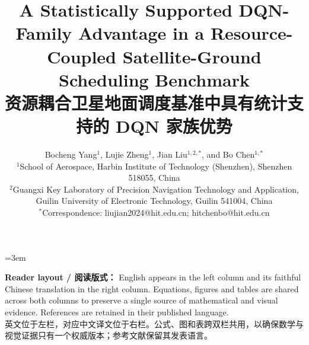 \documentclass[10pt]{article}
\title{\textbf{A Statistically Supported DQN-Family Advantage in a Resource-Coupled Satellite-Ground Scheduling Benchmark}\\[4pt]
\Large 资源耦合卫星地面调度基准中具有统计支持的 DQN 家族优势}
\author{
Bocheng Yang$^{1}$, Lujie Zheng$^{1}$, Jian Liu$^{1,2,*}$, and Bo Chen$^{1,*}$\\[3pt]
\small $^{1}$School of Aerospace, Harbin Institute of Technology (Shenzhen), Shenzhen 518055, China\\
\small $^{2}$Guangxi Key Laboratory of Precision Navigation Technology and Application,\\[-2pt]
\small Guilin University of Electronic Technology, Guilin 541004, China\\
\small $^{*}$Correspondence: liujian2024@hit.edu.cn; hitchenbo@hit.edu.cn
}
\date{}
\begin{document}
\emergencystretch=3em
\maketitle



\noindent\colorbox{modelblue!8}{\parbox{\dimexpr\textwidth-2\fboxsep\relax}{\small
\textbf{Reader layout / 阅读版式：} English appears in the left column and its faithful Chinese translation in the right column. Equations, figures and tables are shared across both columns to preserve a single source of mathematical and visual evidence. References are retained in their published language.\\
英文位于左栏，对应中文译文位于右栏。公式、图和表跨双栏共用，以确保数学与视觉证据只有一个权威版本；参考文献保留其发表语言。}}
\end{document}
